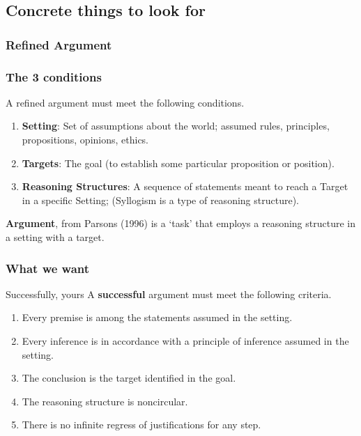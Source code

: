\documentclass{beamer}
\begin{document}
\subsection{Concrete things to look for}
\subsubsection{Refined Argument}
\begin{frame}\frametitle{The 3 conditions}
A refined argument must meet the following conditions.\pause
\begin{enumerate}[<+-| alert@+>]
\item \textbf{Setting}: Set of assumptions about the world; assumed rules, principles, propositions, opinions, ethics.
\item \textbf{Targets}: The goal (to establish some particular proposition or position). 
\item \textbf{Reasoning Structures}: A sequence of statements meant to reach a Target in a specific Setting; (Syllogism is a type of reasoning structure). 
\end{enumerate} \pause
\begin{exampleblock}{\textbf{Argument}, from Parsons (1996)}
 is a `task' that employs a reasoning structure in a setting with a target.
\end{exampleblock}
\end{frame}


\subsubsection{What we want}
\begin{frame}{Successfully, yours}
A \textbf{successful} argument must meet the following criteria. \pause
\begin{enumerate}[<+-| alert@+>]
\item Every premise is among the statements assumed in the setting.
\item Every inference is in accordance with a principle of inference assumed in the setting.
\item The conclusion is the target identified in the goal.
\item The reasoning structure is noncircular.
\item There is no infinite regress of justifications for any step.
\end{enumerate}
\end{frame}
\end{document}
